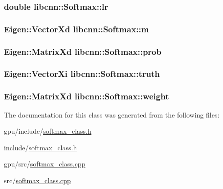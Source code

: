 \hypertarget{classlibcnn_1_1_softmax_a3995e5ba8bc5d766482735974b8eda92}{
\subsubsection[{lr}]{\setlength{\rightskip}{0pt plus 5cm}double {\bf libcnn\-::\-Softmax\-::lr}}}\label{classlibcnn_1_1_softmax_a3995e5ba8bc5d766482735974b8eda92}
\hypertarget{classlibcnn_1_1_softmax_a851740b9977df6ebc1dd3c672e367f56}{
\subsubsection[{m}]{\setlength{\rightskip}{0pt plus 5cm}\-Eigen\-::\-Vector\-Xd {\bf libcnn\-::\-Softmax\-::m}}}\label{classlibcnn_1_1_softmax_a851740b9977df6ebc1dd3c672e367f56}
\hypertarget{classlibcnn_1_1_softmax_a0d1f28abafbb3cddcf87defa87178ce4}{
\subsubsection[{prob}]{\setlength{\rightskip}{0pt plus 5cm}\-Eigen\-::\-Matrix\-Xd {\bf libcnn\-::\-Softmax\-::prob}}}\label{classlibcnn_1_1_softmax_a0d1f28abafbb3cddcf87defa87178ce4}
\hypertarget{classlibcnn_1_1_softmax_ad2c468ea12679d111190c549fc46d8c1}{
\subsubsection[{truth}]{\setlength{\rightskip}{0pt plus 5cm}\-Eigen\-::\-Vector\-Xi {\bf libcnn\-::\-Softmax\-::truth}}}\label{classlibcnn_1_1_softmax_ad2c468ea12679d111190c549fc46d8c1}
\hypertarget{classlibcnn_1_1_softmax_a9904a3314f8b72c089cdfe5930f75445}{
\subsubsection[{weight}]{\setlength{\rightskip}{0pt plus 5cm}\-Eigen\-::\-Matrix\-Xd {\bf libcnn\-::\-Softmax\-::weight}}}\label{classlibcnn_1_1_softmax_a9904a3314f8b72c089cdfe5930f75445}


\-The documentation for this class was generated from the following files\-:\begin{DoxyCompactItemize}
\item 
gpu/include/\hyperlink{gpu_2include_2softmax__class_8h}{softmax\-\_\-class.\-h}\item 
include/\hyperlink{include_2softmax__class_8h}{softmax\-\_\-class.\-h}\item 
gpu/src/\hyperlink{gpu_2src_2softmax__class_8cpp}{softmax\-\_\-class.\-cpp}\item 
src/\hyperlink{src_2softmax__class_8cpp}{softmax\-\_\-class.\-cpp}\end{DoxyCompactItemize}
